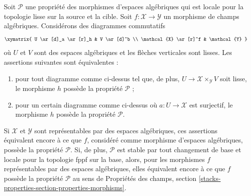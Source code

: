 \begin{lemma}
\label{lemma-local-source-target}
Soit $\mathcal{P}$ une propriété des morphismes d'espaces algébriques
qui est locale pour la topologie lisse sur la source et la cible.
Soit $f : \mathcal{X} \to \mathcal{Y}$ un morphisme de champs algébriques.
Considérons des diagrammes commutatifs
$$
\xymatrix{
U \ar[d]_a \ar[r]_h & V \ar[d]^b \\
\mathcal{X} \ar[r]^f & \mathcal{Y}
}
$$
où $U$ et $V$ sont des espaces algébriques et les flèches verticales
sont lisses. Les assertions suivantes sont équivalentes :
\begin{enumerate}
\item pour tout diagramme comme ci-dessus tel que, de plus,
$U \to \mathcal{X} \times_\mathcal{Y} V$ soit lisse,
le morphisme $h$ possède la propriété $\mathcal{P}$ ;
\item pour un certain diagramme comme ci-dessus où
$a : U \to \mathcal{X}$ est surjectif, le morphisme $h$
possède la propriété $\mathcal{P}$.
\end{enumerate}
Si $\mathcal{X}$ et $\mathcal{Y}$ sont représentables par des espaces
algébriques, ces assertions équivalent encore à ce que $f$, considéré
comme morphisme d'espaces algébriques, possède la propriété $\mathcal{P}$.
Si, de plus, $\mathcal{P}$ est stable par tout changement de base et
locale pour la topologie fppf sur la base, alors, pour les morphismes $f$
représentables par des espaces algébriques, elles équivalent encore à ce
que $f$ possède la propriété $\mathcal{P}$ au sens de Propriétés des champs,
section \ref{stacks-properties-section-properties-morphisms}.
\end{lemma}


